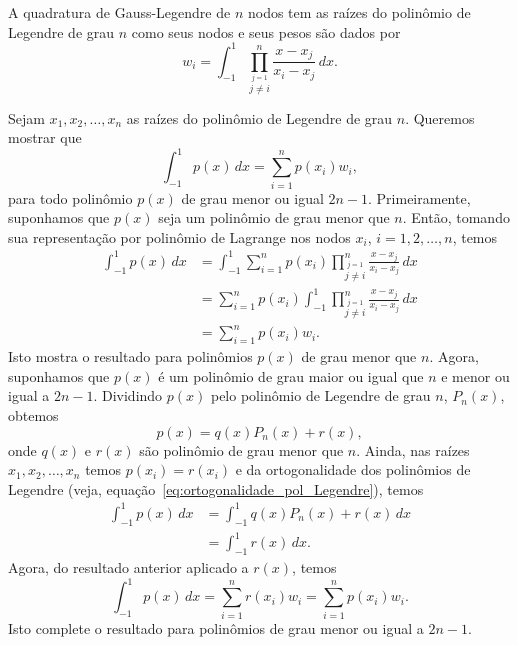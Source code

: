\begin{teo}\label{teo:Gauss-Legendre}
  A quadratura de Gauss-Legendre de $n$ nodos tem as raízes do polinômio de Legendre de grau $n$ como seus nodos e seus pesos são dados por
  \begin{equation}\label{eq:pesos_Gauss-Legendre_1}
    w_i = \int_{-1}^1 \prod_{\overset{j=1}{j\neq i}}^n \frac{x-x_j}{x_i-x_j}\,dx.
  \end{equation}
\end{teo}
\begin{dem}
  Sejam $x_1, x_2, \dotsc, x_n$ as raízes do polinômio de Legendre de grau $n$. Queremos mostrar que
  \begin{equation}
    \int_{-1}^1 p(x)\,dx = \sum_{i=1}^n p(x_i)w_i,
  \end{equation}
para todo polinômio $p(x)$ de grau menor ou igual $2n-1$. Primeiramente, suponhamos que $p(x)$ seja um polinômio de grau menor que $n$. Então, tomando sua representação por polinômio de Lagrange nos nodos $x_i$, $i=1, 2, \ldots, n$, temos
\begin{align}
  \int_{-1}^1 p(x)\,dx &= \int_{-1}^1 \sum_{i=1}^n p(x_i)\prod_{\overset{j=1}{j\neq i}}^n \frac{x-x_j}{x_i-x_j}\,dx\\
  &= \sum_{i=1}^n p(x_i) \int_{-1}^1 \prod_{\overset{j=1}{j\neq i}}^n \frac{x-x_j}{x_i-x_j}\,dx\\
  &= \sum_{i=1}^n p(x_i)w_i.
\end{align}
Isto mostra o resultado para polinômios $p(x)$ de grau menor que $n$. Agora, suponhamos que $p(x)$ é um polinômio de grau maior ou igual que $n$ e menor ou igual a $2n-1$. Dividindo $p(x)$ pelo polinômio de Legendre de grau $n$, $P_n(x)$,  obtemos
\begin{equation}
  p(x) = q(x)P_n(x) + r(x),
\end{equation}
onde $q(x)$ e $r(x)$ são polinômio de grau menor que $n$. Ainda, nas raízes $x_1, x_2, \dotsc, x_n$ temos $p(x_i) = r(x_i)$ e da ortogonalidade dos polinômios de Legendre (veja, equação~\eqref{eq:ortogonalidade_pol_Legendre}), temos
\begin{align}
  \int_{-1}^1 p(x)\,dx &= \int_{-1}^1 q(x)P_n(x) + r(x)\,dx\\
  &= \int_{-1}^1 r(x)\,dx.
\end{align}
Agora, do resultado anterior aplicado a $r(x)$, temos
\begin{equation}
  \int_{-1}^1 p(x)\,dx = \sum_{i=1}^n r(x_i)w_i = \sum_{i=1}^n p(x_i)w_i.
\end{equation}
Isto complete o resultado para polinômios de grau menor ou igual a $2n-1$.
\end{dem}

